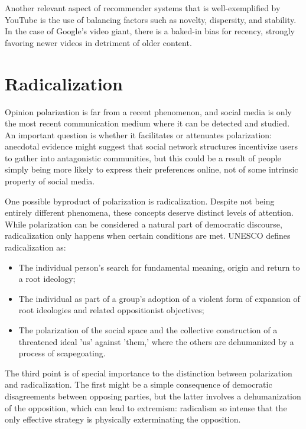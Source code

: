 Another relevant aspect of recommender systems that is well-exemplified by
YouTube is the use of balancing factors such as novelty, dispersity, and
stability. In the case of Google's video giant, there is a baked-in bias for
recency, strongly favoring newer videos in detriment of older content.

\section{Radicalization}
\label{sec:radicalization}

Opinion polarization is far from a recent phenomenon, and social media is only
the most recent communication medium where it can be detected and studied. An
important question is whether it facilitates or attenuates polarization:
anecdotal evidence might suggest that social network structures incentivize
users to gather into antagonistic communities, but this could be a result of
people simply being more likely to express their preferences online, not of some
intrinsic property of social media.

One possible byproduct of polarization is radicalization. Despite not being
entirely different phenomena, these concepts deserve distinct levels of
attention. While polarization can be considered a natural part of democratic
discourse, radicalization only happens when certain conditions are met. UNESCO
defines radicalization as:

\begin{itemize}
  \item The individual person's search for fundamental meaning, origin and
        return to a root ideology;
  \item The individual as part of a group's adoption of a violent form of
        expansion of root ideologies and related oppositionist objectives;
  \item The polarization of the social space and the collective construction of
        a threatened ideal 'us' against 'them,' where the others are dehumanized
        by a process of scapegoating.
\end{itemize}

The third point is of special importance to the distinction between polarization
and radicalization. The first might be a simple consequence of democratic
disagreements between opposing parties, but the latter involves a dehumanization
of the opposition, which can lead to extremism: radicalism so intense that the
only effective strategy is physically exterminating the opposition.

